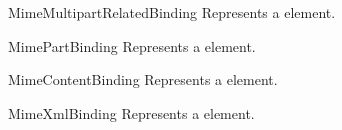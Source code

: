 \begin{classdesc}{MimeMultipartRelatedBinding}{}
Represents a  element.
\end{classdesc}

\begin{classdesc}{MimePartBinding}{}
Represents a  element.
\end{classdesc}

\begin{classdesc}{MimeContentBinding}{}
Represents a  element.
\end{classdesc}

\begin{classdesc}{MimeXmlBinding}{}
Represents a  element.
\end{classdesc}

